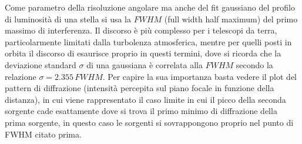 \documentclass[a4paper,twoside,openany,notitlepage]{book}
\theoremstyle{definition}
\theoremstyle{plain}
\begin{document}
Come parametro della risoluzione angolare ma anche del fit gaussiano del profilo di luminosità di una stella si usa la $FWHM$ (full width half maximum) del primo massimo di interferenza. Il discorso è più complesso per i telescopi da terra, particolarmente limitati dalla turbolenza atmosferica, mentre per quelli posti in orbita il discorso di esaurisce proprio in questi termini, dove si ricorda che la deviazione standard $\sigma$ di una gaussiana è correlata alla $FWHM$ secondo la relazione $\sigma=2.355\, FWHM$. Per capire la sua importanza basta vedere il plot del pattern di diffrazione (intensità percepita sul piano focale in funzione della distanza), in cui viene rappresentato il caso limite in cui il picco della seconda sorgente cade esattamente dove si trova il primo minimo di diffrazione della prima sorgente, in questo caso le sorgenti si sovrappongono proprio nel punto di FWHM citato prima.
\end{document}
